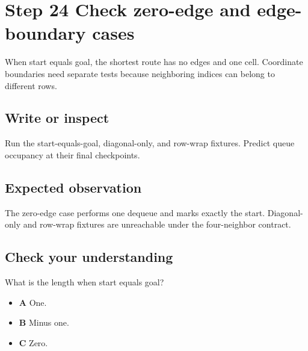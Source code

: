 \section{Step 24 Check zero-edge and edge-boundary cases}\label{maze-s24}

When start equals goal, the shortest route has no edges and one cell. Coordinate boundaries need separate tests because neighboring indices can belong to different rows.

\subsection{Write or inspect}

Run the start-equals-goal, diagonal-only, and row-wrap fixtures. Predict queue occupancy at their final checkpoints.

\subsection{Expected observation}

The zero-edge case performs one dequeue and marks exactly the start. Diagonal-only and row-wrap fixtures are unreachable under the four-neighbor contract.

\subsection{Check your understanding}

What is the length when start equals goal?

\begin{itemize}
  \item \textbf{A} One.
  \item \textbf{B} Minus one.
  \item \textbf{C} Zero.
\end{itemize}
